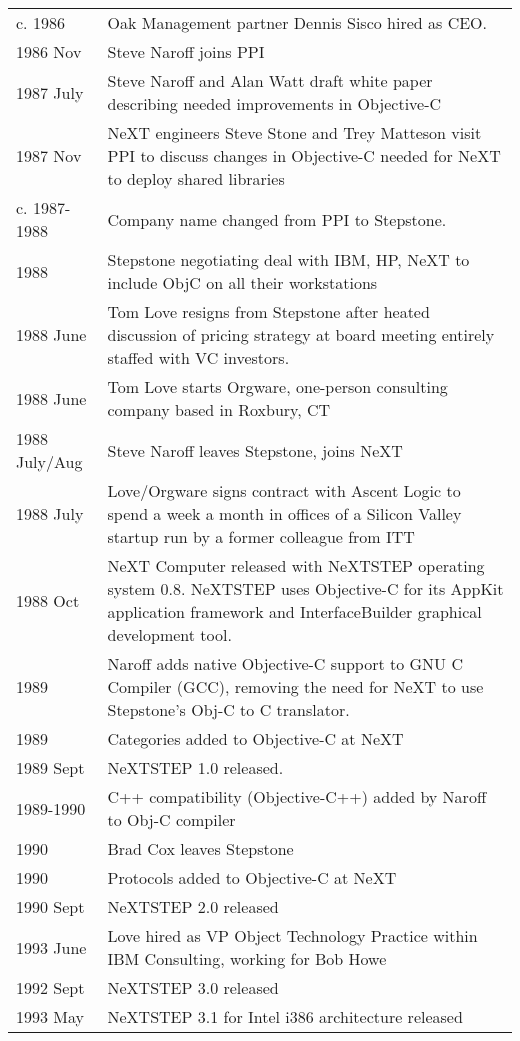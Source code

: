 \documentclass[acmsmall,screen]{acmart}
\begin{document}
\begin{longtable}{lp{4.40in}}
c. 1986 	& Oak Management partner Dennis Sisco hired as CEO. \\
1986 Nov	& Steve Naroff joins PPI \\
1987 July    & Steve Naroff and Alan Watt draft white paper describing needed improvements in Objective-C \\
1987 Nov    & NeXT engineers Steve Stone and Trey Matteson visit PPI to discuss changes in Objective-C needed for NeXT to deploy shared libraries \\
c. 1987-1988   & Company name changed from PPI to Stepstone. \\
1988 	& Stepstone negotiating deal with IBM, HP, NeXT to include ObjC on all their workstations \\
1988 June	& Tom Love resigns from Stepstone after heated discussion of pricing strategy at board meeting entirely staffed with VC investors. \\
1988 June	& Tom Love starts Orgware, one-person consulting company based in Roxbury, CT \\
1988 July/Aug	& Steve Naroff leaves Stepstone, joins NeXT \\
1988 July	& Love/Orgware signs contract with Ascent Logic to spend a week a month in offices of a Silicon Valley startup run by a former colleague from ITT \\
1988 Oct	& NeXT Computer released with NeXTSTEP operating system 0.8. NeXTSTEP uses Objective-C for its AppKit application framework and InterfaceBuilder graphical development tool. \\
1989	& Naroff adds native Objective-C support to GNU C Compiler (GCC), removing the need for NeXT to use Stepstone's Obj-C to C translator. \\
1989	& Categories added to Objective-C at NeXT \\
1989 Sept	& NeXTSTEP 1.0 released. \\
1989-1990	& C++ compatibility (Objective-C++) added by Naroff to Obj-C compiler \\
1990 	& Brad Cox leaves Stepstone \\
1990 	& Protocols added to Objective-C at NeXT \\
1990 Sept	& NeXTSTEP 2.0 released \\
1993 June	& Love hired as VP Object Technology Practice within IBM Consulting, working for Bob Howe \\
1992 Sept	& NeXTSTEP 3.0 released \\
1993 May	& NeXTSTEP 3.1 for Intel i386 architecture released \\

\end{longtable}
\end{document}
